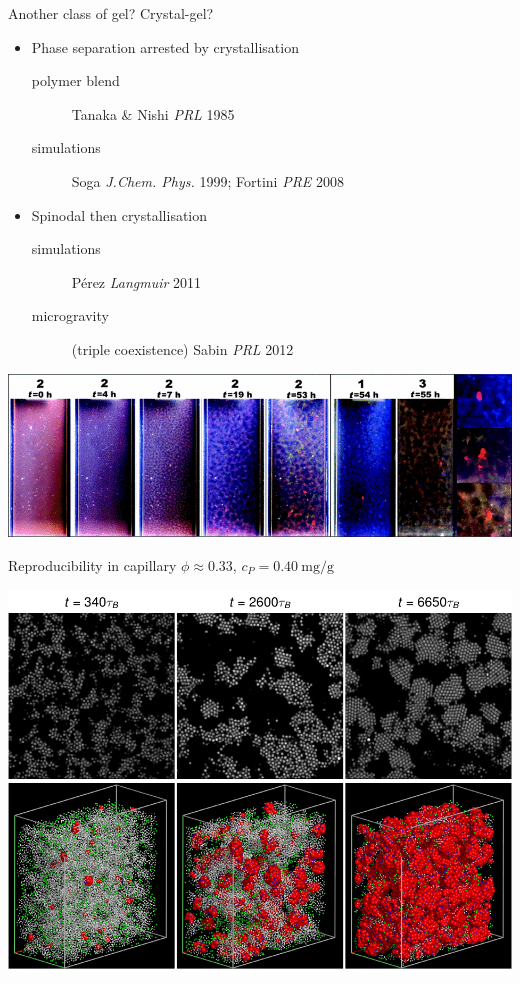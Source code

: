 \documentclass[xcolor=table]{beamer}
\begin{document}
\begin{frame}{Another class of gel? Crystal-gel?}
	\begin{itemize}
	\item Phase separation arrested by crystallisation
	\begin{description}
		\item[polymer blend] Tanaka \& Nishi \textit{PRL} 1985
		\item[simulations] Soga \textit{J.Chem. Phys.} 1999; Fortini \textit{PRE} 2008 
	\end{description}
	\item Spinodal then crystallisation
	\begin{description}
		\item[simulations] Pérez \textit{Langmuir} 2011
		\item[microgravity] (triple coexistence) Sabin \textit{PRL} 2012
	\end{description}
	\end{itemize}
	\includegraphics[width=\textwidth]{presentation/micrograv_Sabin2012}
\end{frame}

\begin{frame}{Reproducibility in capillary}
	\hfill $\phi\approx 0.33$, $c_P=\SI{0.40}{\milli\gram/\gram}$
	
	\includegraphics[width=\textwidth]{nature/capillary}
\end{frame}
\end{document}
